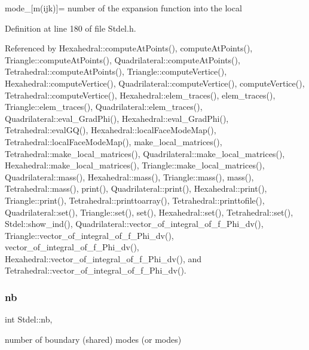 mode\+\_\+\mbox{[}m(ijk)\mbox{]}= number of the expansion function into the local 



Definition at line 180 of file Stdel.\+h.



Referenced by Hexahedral\+::compute\+At\+Points(), compute\+At\+Points(), Triangle\+::compute\+At\+Points(), Quadrilateral\+::compute\+At\+Points(), Tetrahedral\+::compute\+At\+Points(), Triangle\+::compute\+Vertice(), Hexahedral\+::compute\+Vertice(), Quadrilateral\+::compute\+Vertice(), compute\+Vertice(), Tetrahedral\+::compute\+Vertice(), Hexahedral\+::elem\+\_\+traces(), elem\+\_\+traces(), Triangle\+::elem\+\_\+traces(), Quadrilateral\+::elem\+\_\+traces(), Quadrilateral\+::eval\+\_\+\+Grad\+Phi(), Hexahedral\+::eval\+\_\+\+Grad\+Phi(), Tetrahedral\+::eval\+G\+Q(), Hexahedral\+::local\+Face\+Mode\+Map(), Tetrahedral\+::local\+Face\+Mode\+Map(), make\+\_\+local\+\_\+matrices(), Tetrahedral\+::make\+\_\+local\+\_\+matrices(), Quadrilateral\+::make\+\_\+local\+\_\+matrices(), Hexahedral\+::make\+\_\+local\+\_\+matrices(), Triangle\+::make\+\_\+local\+\_\+matrices(), Quadrilateral\+::mass(), Hexahedral\+::mass(), Triangle\+::mass(), mass(), Tetrahedral\+::mass(), print(), Quadrilateral\+::print(), Hexahedral\+::print(), Triangle\+::print(), Tetrahedral\+::printtoarray(), Tetrahedral\+::printtofile(), Quadrilateral\+::set(), Triangle\+::set(), set(), Hexahedral\+::set(), Tetrahedral\+::set(), Stdel\+::show\+\_\+ind(), Quadrilateral\+::vector\+\_\+of\+\_\+integral\+\_\+of\+\_\+f\+\_\+\+Phi\+\_\+dv(), Triangle\+::vector\+\_\+of\+\_\+integral\+\_\+of\+\_\+f\+\_\+\+Phi\+\_\+dv(), vector\+\_\+of\+\_\+integral\+\_\+of\+\_\+f\+\_\+\+Phi\+\_\+dv(), Hexahedral\+::vector\+\_\+of\+\_\+integral\+\_\+of\+\_\+f\+\_\+\+Phi\+\_\+dv(), and Tetrahedral\+::vector\+\_\+of\+\_\+integral\+\_\+of\+\_\+f\+\_\+\+Phi\+\_\+dv().

\mbox{\label{classStdel_ad1d9acc38335d3fd779ba5c14f1507f8}} 
\subsubsection{\texorpdfstring{nb}{nb}}
{\footnotesize\ttfamily int Stdel\+::nb\hspace{0.3cm}{\ttfamily [protected]}, {\ttfamily [inherited]}}



number of boundary (shared) modes (or modes) 




